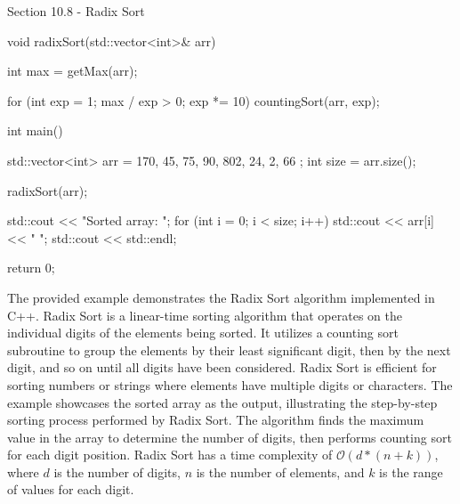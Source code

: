 \begin{notes}{Section 10.8 - Radix Sort}
\begin{highlight}
\begin{code}[C++]
        void radixSort(std::vector<int>& arr) {
            int max = getMax(arr);
        
            for (int exp = 1; max / exp > 0; exp *= 10) {
                countingSort(arr, exp);
            }
        }
        
        int main() {
            std::vector<int> arr = { 170, 45, 75, 90, 802, 24, 2, 66 };
            int size = arr.size();
        
            radixSort(arr);
        
            std::cout << "Sorted array: ";
            for (int i = 0; i < size; i++) {
                std::cout << arr[i] << " ";
            }
            std::cout << std::endl;
        
            return 0;
        }
        \end{code}
        The provided example demonstrates the Radix Sort algorithm implemented in C++. Radix Sort is a linear-time sorting algorithm that operates on the individual digits of the elements being sorted. It utilizes a counting sort subroutine to group the elements by their least significant digit, then by the next digit, and so on until all digits have
        been considered. Radix Sort is efficient for sorting numbers or strings where elements have multiple digits or characters. The example showcases the sorted array as the output, illustrating the step-by-step sorting process performed by Radix Sort. The algorithm finds the maximum value in the array to determine the number of digits, then performs
        counting sort for each digit position. Radix Sort has a time complexity of $\mathcal{O}(d*(n+k))$, where $d$ is the number of digits, $n$ is the number of elements, and $k$ is the range of values for each digit.
    \end{highlight}
\end{notes}

